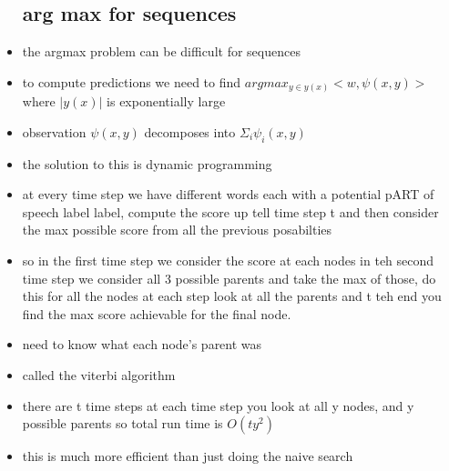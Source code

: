 \documentclass{article}
\begin{document}
\begin{itemize}
\subsection*{arg max for sequences}
\item the argmax problem can be difficult for sequences
\item to compute predictions we need to find $argmax_{y\in y(x)}<w,\psi(x,y)>$ where $|y(x)|$ is exponentially large
\item observation $\psi(x,y)$ decomposes into $\Sigma_{i}\psi_i(x,y)$
\item the solution to this is dynamic programming 
\item at every time step we have different words each with a potential pART of speech label  label, compute the score up tell time step t and then consider the max possible score from all the previous posabilties
\item so in the first time step we consider the score at each nodes in teh second time step we consider all 3 possible parents and take the max of those, do this for all the nodes at each step look at all the parents and t teh end you find the max score achievable for the final node. 
\item need to know what each node's parent was 
\item called the viterbi algorithm
\item there are t time steps at each time step you look at all y nodes, and y possible parents so total run time is $O(ty^2)$
\item this is much more efficient than just doing the naive search 

\end{itemize}
\end{document}
